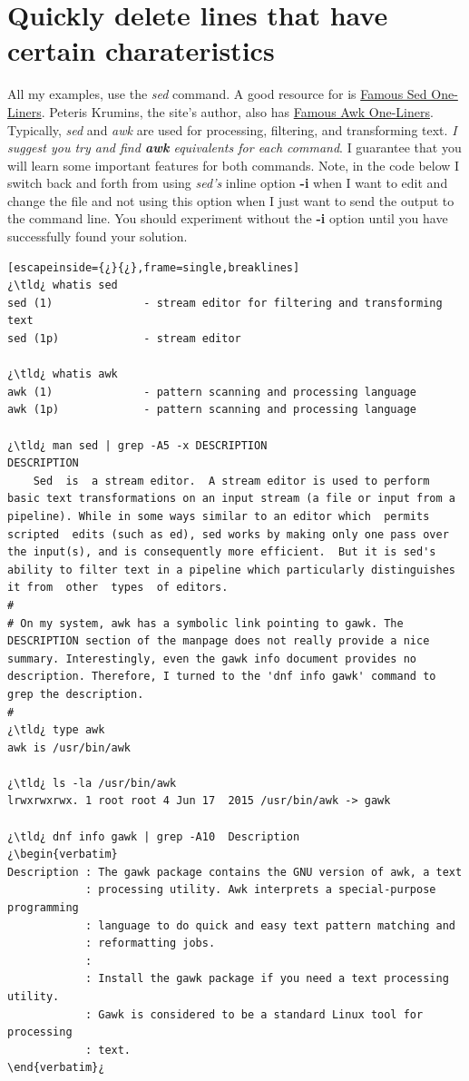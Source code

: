 \section{Quickly delete lines that have certain charateristics}

All my examples, use the \emph{sed} command. A good resource for  is \href{http://www.catonmat.net/blog/sed-one-liners-explained-part-one/}{Famous Sed One-Liners}. Peteris Krumins, the site's author, also has \href{http://www.catonmat.net/blog/awk-one-liners-explained-part-one/}{Famous Awk One-Liners}. Typically,  \emph{sed} and \emph{awk} are used for processing, filtering, and transforming text. \textit{I suggest you try and find \textbf{awk} equivalents for each command}. I guarantee that you will learn some important features for both commands. Note, in the code below I switch back and forth from using \emph{sed's} inline option \textbf{-i} when I want to edit and change the file and not using this option when I just want to send the output to the command line. You should experiment without the \textbf{-i} option until you have successfully found your solution.

\begin{lstlisting}[escapeinside={¿}{¿},frame=single,breaklines]
¿\tld¿ whatis sed
sed (1)              - stream editor for filtering and transforming text
sed (1p)             - stream editor

¿\tld¿ whatis awk
awk (1)              - pattern scanning and processing language
awk (1p)             - pattern scanning and processing language

¿\tld¿ man sed | grep -A5 -x DESCRIPTION
DESCRIPTION
	Sed  is  a stream editor.  A stream editor is used to perform basic text transformations on an input stream (a file or input from a pipeline). While in some ways similar to an editor which  permits  scripted  edits (such as ed), sed works by making only one pass over the input(s), and is consequently more efficient.  But it is sed's ability to filter text in a pipeline which particularly distinguishes it from  other  types  of editors.
#
# On my system, awk has a symbolic link pointing to gawk. The DESCRIPTION section of the manpage does not really provide a nice summary. Interestingly, even the gawk info document provides no description. Therefore, I turned to the 'dnf info gawk' command to grep the description.
#
¿\tld¿ type awk
awk is /usr/bin/awk

¿\tld¿ ls -la /usr/bin/awk
lrwxrwxrwx. 1 root root 4 Jun 17  2015 /usr/bin/awk -> gawk

¿\tld¿ dnf info gawk | grep -A10  Description
¿\begin{verbatim}
Description : The gawk package contains the GNU version of awk, a text
            : processing utility. Awk interprets a special-purpose programming
            : language to do quick and easy text pattern matching and
            : reformatting jobs.
            : 
            : Install the gawk package if you need a text processing utility.
            : Gawk is considered to be a standard Linux tool for processing
            : text.
\end{verbatim}¿
\end{lstlisting}

